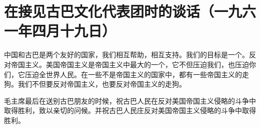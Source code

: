 \section{在接见古巴文化代表团时的谈话（一九六一年四月十九日）}


中国和古巴是两个友好的国家，我们相互帮助，相互支持。我们的目标是一个。反对帝国主义。美国帝国主义是帝国主义中最大的一个，它不但压迫我们，也压迫你们，它压迫全世界人民。在一些不是帝国主义的国家中，都有一些帝国主义的走狗。我们不但要反对帝国主义，也要反对帝国主义的走狗。

毛主席最后在送别古巴朋友的时候，祝古巴人民在反对美国帝国主义侵略的斗争中取得胜利，致以亲切的问候。并祝古巴人民庄反对美国帝国主义侵略的斗争中取得胜利。


